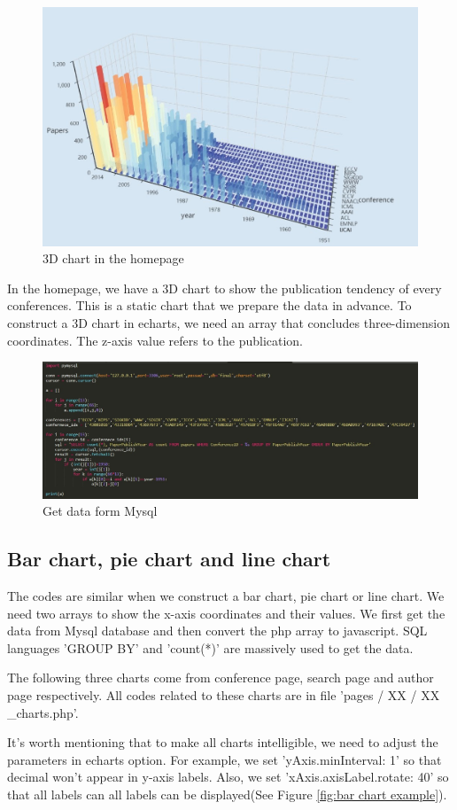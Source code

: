 \documentclass{book}
\begin{document}
\begin{figure}[H]
\centering
\includegraphics[scale=0.55]{img/fsh_3d_hist.jpg}
\caption{3D chart in the homepage}
\end{figure}

In the homepage, we have a 3D chart to show the publication tendency of every conferences. This is a static chart that we prepare the data in advance. To construct a 3D chart in echarts, we need an array that concludes three-dimension coordinates. The z-axis value refers to the publication.

\begin{figure}[H]
\centering
\includegraphics[scale=0.45]{img/fsh_code_1.jpg}
\caption{Get data form Mysql}
\end{figure}

\subsection {Bar chart, pie chart and line chart}

The codes are similar when we construct a bar chart, pie chart or line chart. We need two arrays to show the x-axis coordinates and their values. We first get the data from Mysql database and then convert the php array to javascript. SQL languages 'GROUP BY' and 'count(*)' are massively used to get the data.
\par The following three charts come from conference page, search page and author page respectively. All codes related to these charts are in file 'pages / XX / XX \_charts.php'.
\par It's worth mentioning that to make all charts intelligible, we need to adjust the parameters in echarts option. For example, we set 'yAxis.minInterval: 1' so that decimal won't appear in y-axis labels. Also, we set 'xAxis.axisLabel.rotate: 40' so that all labels can all labels can be displayed(See Figure \ref{fig:bar chart example}).
\end{document}
